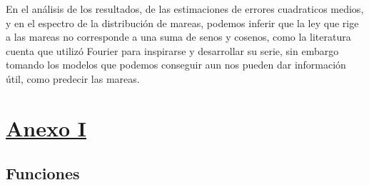 \documentclass[10pt,a4paper]{article}
\numberwithin{equation}{section}
\numberwithin{figure}{section}
\numberwithin{table}{section}
\begin{document}
En el análisis de los resultados, de las estimaciones de errores cuadraticos medios, y en el espectro de la distribución de mareas, podemos inferir que la ley que rige a las mareas no corresponde a una suma de senos y cosenos, como la literatura cuenta que utilizó Fourier para inspirarse y desarrollar su serie, sin embargo tomando los modelos que podemos conseguir aun nos pueden dar información útil, como predecir las mareas.

\section{\underline{Anexo I}}



\subsection{Funciones}
\end{document}
